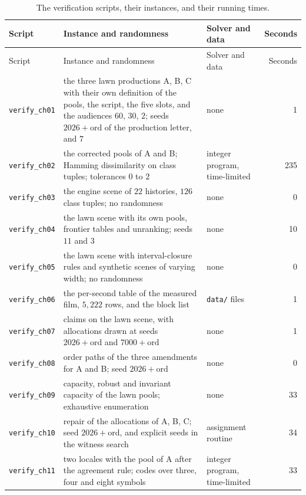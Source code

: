 \documentclass[11pt,twoside,openright]{book}
\theoremstyle{plain}
\theoremstyle{definition}
\theoremstyle{remark}
\begin{document}
\begin{longtable}{@{}>{\raggedright\arraybackslash}p{2.6cm}>{\raggedright\arraybackslash}p{6.0cm}>{\raggedright\arraybackslash}p{2.4cm}r@{}}
\caption{The verification scripts, their instances, and their running times.}\label{tab:scripts}\\
\toprule
Script & Instance and randomness & Solver and data & Seconds\\
\midrule
\endfirsthead
\toprule
Script & Instance and randomness & Solver and data & Seconds\\
\midrule
\endhead
\bottomrule
\endfoot
\texttt{verify\_ch01} & the three lawn productions A, B, C with their own definition of the pools, the script, the five slots, and the audiences $60$, $30$, $2$; seeds $2026+\mathrm{ord}$ of the production letter, and $7$ & none & 1\\
\texttt{verify\_ch02} & the corrected pools of A and B; Hamming dissimilarity on class tuples; tolerances $0$ to $2$ & integer program, time-limited & 235\\
\texttt{verify\_ch03} & the engine scene of $22$ histories, $126$ class tuples; no randomness & none & 0\\
\texttt{verify\_ch04} & the lawn scene with its own pools, frontier tables and unranking; seeds $11$ and $3$ & none & 10\\
\texttt{verify\_ch05} & the lawn scene with interval-closure rules and synthetic scenes of varying width; no randomness & none & 0\\
\texttt{verify\_ch06} & the per-second table of the measured film, $5{,}222$ rows, and the block list & \texttt{data/} files & 1\\
\texttt{verify\_ch07} & claims on the lawn scene, with allocations drawn at seeds $2026+\mathrm{ord}$ and $7000+\mathrm{ord}$ & none & 1\\
\texttt{verify\_ch08} & order paths of the three amendments for A and B; seed $2026+\mathrm{ord}$ & none & 0\\
\texttt{verify\_ch09} & capacity, robust and invariant capacity of the lawn pools; exhaustive enumeration & none & 33\\
\texttt{verify\_ch10} & repair of the allocations of A, B, C; seed $2026+\mathrm{ord}$, and explicit seeds in the witness search & assignment routine & 34\\
\texttt{verify\_ch11} & two locales with the pool of A after the agreement rule; codes over three, four and eight symbols & integer program, time-limited & 33\\

\end{longtable}
\end{document}
